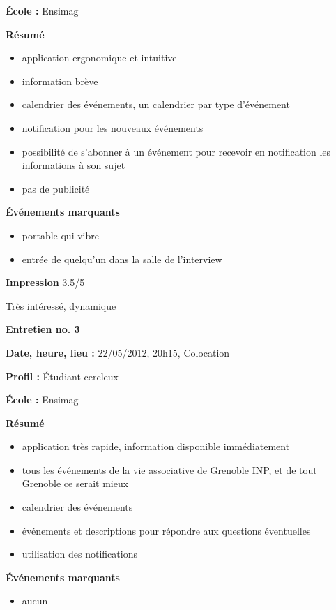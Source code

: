 \documentclass[a4paper, 11px]{article}
\begin{document}
\textbf{École : }
Ensimag

\textbf{Résumé}
	\begin{itemize}
		\item application ergonomique et intuitive
		\item information brève
		\item calendrier des événements, un calendrier par type d'événement
		\item notification pour les nouveaux événements
		\item possibilité de s'abonner à un événement pour recevoir en notification les informations à son sujet
		\item pas de publicité
	\end{itemize}

\vspace{.25cm}
\textbf{Événements marquants}
	\begin{itemize}
		\item portable qui vibre
		\item entrée de quelqu'un dans la salle de l'interview
	\end{itemize}

\vspace{.25cm}
\textbf{Impression} 3.5/5 

Très intéressé, dynamique



\vspace{.3cm}

 \textbf {\large Entretien no. 3}

\textbf{Date, heure, lieu : }
22/05/2012, 20h15, Colocation

\textbf{Profil : }
Étudiant cercleux

\textbf{École : }
Ensimag

\textbf{Résumé}
	\begin{itemize}
		\item application très rapide, information disponible immédiatement
		\item tous les événements de la vie associative de Grenoble INP, et de tout Grenoble ce serait mieux
		\item calendrier des événements
		\item événements et descriptions pour répondre aux questions éventuelles
		\item utilisation des notifications
	\end{itemize}

\vspace{.25cm}
\textbf{Événements marquants}
	\begin{itemize}
		\item aucun
	\end{itemize}
\end{document}
